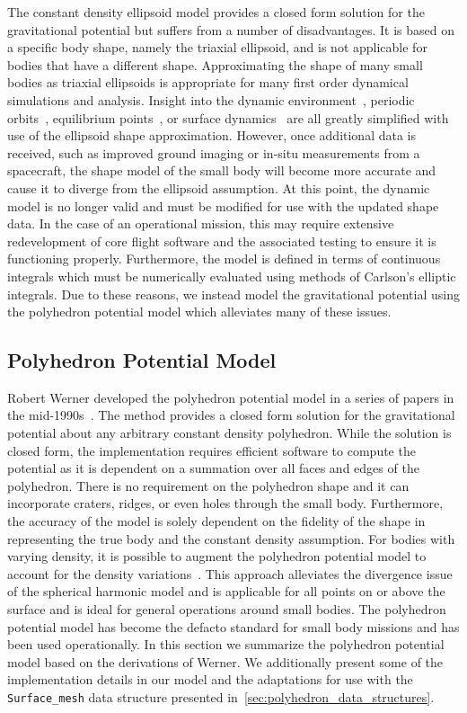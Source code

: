 The constant density ellipsoid model provides a closed form solution for the gravitational potential but suffers from a number of disadvantages.
It is based on a specific body shape, namely the triaxial ellipsoid, and is not applicable for bodies that have a different shape.
Approximating the shape of many small bodies as triaxial ellipsoids is appropriate for many first order dynamical simulations and analysis.
Insight into the dynamic environment~\cite{guelman2014}, periodic orbits~\cite{hu2002}, equilibrium points~\cite{scheeres1994}, or surface dynamics~\cite{furfaro2013} are all greatly simplified with use of the ellipsoid shape approximation.
However, once additional data is received, such as improved ground imaging or in-situ measurements from a spacecraft, the shape model of the small body will become more accurate and cause it to diverge from the ellipsoid assumption.
At this point, the dynamic model is no longer valid and must be modified for use with the updated shape data.
In the case of an operational mission, this may require extensive redevelopment of core flight software and the associated testing to ensure it is functioning properly. 
Furthermore, the model is defined in terms of continuous integrals which must be numerically evaluated using methods of Carlson's elliptic integrals.
Due to these reasons, we instead model the gravitational potential using the polyhedron potential model which alleviates many of these issues.

\subsection{Polyhedron Potential Model}\label{sec:polyhedron_potential}

Robert Werner developed the polyhedron potential model in a series of papers in the mid-1990s~\cite{werner1994,werner1996,werner1997}.
The method provides a closed form solution for the gravitational potential about any arbitrary constant density polyhedron.
While the solution is closed form, the implementation requires efficient software to compute the potential as it is dependent on a summation over all faces and edges of the polyhedron.
There is no requirement on the polyhedron shape and it can incorporate craters, ridges, or even holes through the small body.
Furthermore, the accuracy of the model is solely dependent on the fidelity of the shape in representing the true body and the constant density assumption.
For bodies with varying density, it is possible to augment the polyhedron potential model to account for the density variations~\cite{scheeres2000a}.
This approach alleviates the divergence issue of the spherical harmonic model and is applicable for all points on or above the surface and is ideal for general operations around small bodies.
The polyhedron potential model has become the defacto standard for small body missions and has been used operationally.
In this section we summarize the polyhedron potential model based on the derivations of Werner.
We additionally present some of the implementation details in our model and the adaptations for use with the \texttt{Surface\_mesh} data structure presented  in~\cref{sec:polyhedron_data_structures}.

